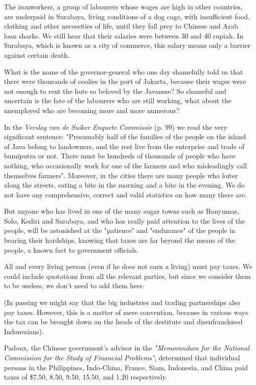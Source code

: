 The ironworkers, a group of labourers whose wages are high in other countries, 
are underpaid in Surabaya, living conditions of a dog cage, with insufficient food, 
clothing and other necessities of life, until they fall prey to Chinese and Arab loan sharks. 
We still hear that their salaries were between 30 and 40 rupiah. In Surabaya, which is known as 
a city of commerce, this salary means only a barrier against certain death.\nline

What is the name of the governor-general who one day shamefully told us that there were 
thousands of coolies in the port of Jakarta, because their wages were not enough to rent 
the huts so beloved by the Javanese? So shameful and uncertain is the fate of the labourers 
who are still working, what about the unemployed who are becoming more and more numerous?\nline

In the \emph{Verslag van de Suiker Enquete Commissie} (p. 99) we read the very significant sentence: 
"Presumably half of the families of the people on the island of Java belong to landowners, 
and the rest live from the enterprise and trade of bumiputra or not. There must be 
hundreds of thousands of people who have nothing, who occasionally work for one of 
the farmers and who misleadingly call themselves farmers". Moreover, in the cities 
there are many people who loiter along the streets, eating a bite in the morning and 
a bite in the evening. We do not have any comprehensive, correct and valid statistics on how many there are.\nline

But anyone who has lived in one of the many sugar towns such as Banyumas, Solo, Kediri 
and Surabaya, and who has really paid attention to the lives of the people, will be 
astonished at the "patience" and "endurance" of the people in bearing their hardships, 
knowing that taxes are far beyond the means of the people, a known fact to government officials.\nline

All and every living person (even if he does not earn a living) must pay taxes. 
We could include quotations from all the relevant parties, but since we consider them to be useless, we don't need to add them here.\nline

(In passing we might say that the big industries and trading partnerships also pay taxes. 
However, this is a matter of mere convention, because in various ways the tax can be brought 
down on the heads of the destitute and disenfranchised Indonesians).\nline

Padoux, the Chinese government's advisor in the \emph{"Memorandum for the National Commission 
for the Study of Financial Problems"}, determined that individual persons in the Philippines, 
Indo-China, France, Siam, Indonesia, and China paid taxes of \$7.50, 8.50, 9.50, 15.50, and 1.20 respectively.\nline

